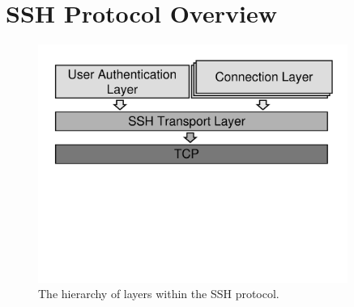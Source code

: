 \section{SSH Protocol Overview}
\label{sec:ssh-overview}

\begin{figure}[t]
  \centering

  \includegraphics[width=0.9\textwidth,keepaspectratio=true]{sshlayer}
  \vspace{-13.5em}

  \caption{The hierarchy of layers within the SSH protocol.}
  \label{fig:ssh}
  \vspace{-1.5em}
\end{figure}

